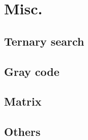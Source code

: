 \section{Misc.}

\subsection{Ternary search}

\subsection{Gray code}

\subsection{Matrix}

\subsection{Others}
  
